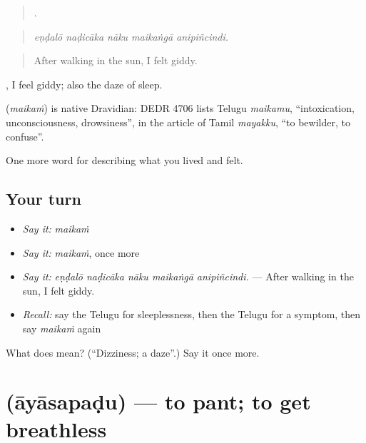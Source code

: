 \begin{quote}
    .
\end{quote}

\begin{quote}
\emph{eṇḍalō naḍicāka nāku maikaṅgā anipiñcindi.}
\end{quote}

\begin{quote}
After walking in the sun, I felt giddy.
\end{quote}

 , I feel giddy; also the daze of sleep.

\begin{cousinweb}
\textbf{} (\emph{maikaṁ}) is native Dravidian: DEDR 4706 lists Telugu \emph{maikamu}, \textquotedblleft{}intoxication, unconsciousness, drowsiness\textquotedblright{}, in the article of Tamil \emph{mayakku}, \textquotedblleft{}to bewilder, to confuse\textquotedblright{}.
\end{cousinweb}

\begin{grammarlens}[title={What you've built}]
One more word for describing what you lived and felt.
\end{grammarlens}

\subsection*{Your turn}
\begin{itemize}
\raggedright
  \item \emph{Say it:} \emph{maikaṁ}
  \item \emph{Say it:} \emph{maikaṁ}, once more
  \item \emph{Say it:} \emph{eṇḍalō naḍicāka nāku maikaṅgā anipiñcindi.} — After walking in the sun, I felt giddy.
  \item \emph{Recall:} say the Telugu for sleeplessness, then the Telugu for a symptom, then say \emph{maikaṁ} again
\end{itemize}

\begin{tcolorbox}[breakable,colback=teal!4,colframe=teal!35!black,title={Before you move on}]
What does  mean? (\textquotedblleft{}Dizziness; a daze\textquotedblright{}.) Say it once more.
\end{tcolorbox}
\section[\texorpdfstring{\te{ఆయాసపడు} (āyāsapaḍu)}{ఆయాసపడు (āyāsapaḍu)}]{ (āyāsapaḍu) — to pant; to get breathless}

